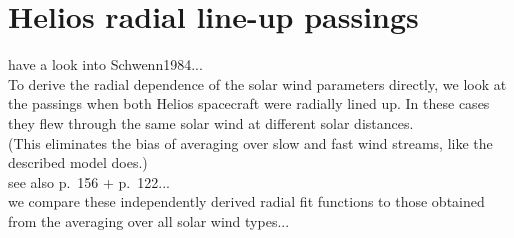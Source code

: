 
\chapter{Helios radial line-up passings}


have a look into Schwenn1984...\\

To derive the radial dependence of the solar wind parameters directly, we look at the passings when both Helios spacecraft were radially lined up. In these cases they flew through the same solar wind at different solar distances.\\
(This eliminates the bias of averaging over slow and fast wind streams, like the described model does.)\\
see also \citet{Schwenn1990} p.~156 + p.~122...\\

we compare these independently derived radial fit functions to those obtained from the averaging over all solar wind types...\\

